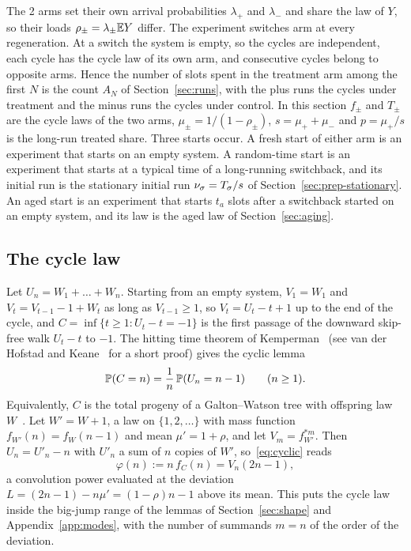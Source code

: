 The 2 arms set their own arrival probabilities $\lambda_\plus$ and $\lambda_\minus$ and
share the law of $Y$, so their loads $\rho_\pm=\lambda_\pm\mathbb{E} Y$ differ. The experiment
switches arm at every regeneration. At a switch the system is empty, so the cycles are
independent, each cycle has the cycle law of its own arm, and consecutive cycles belong to
opposite arms. Hence the number of slots spent in the treatment arm among the first $N$ is
the count $A_N$ of Section~\ref{sec:runs}, with the plus runs the cycles under treatment and
the minus runs the cycles under control. In this section $f_\pm$ and $T_\pm$ are the cycle
laws of the two arms, $\mu_\pm=1/(1-\rho_\pm)$, $s=\mu_\plus+\mu_\minus$ and $p=\mu_\plus/s$ is the
long-run treated share. Three starts occur. A fresh start of either arm is an experiment
that starts on an empty system. A random-time start is an experiment that starts at a
typical time of a long-running switchback, and its initial run is the stationary initial run
$\nu_\sigma=T_\sigma/s$ of Section~\ref{sec:prep-stationary}. An aged start is an experiment that
starts $t_a$ slots after a switchback started on an empty system, and its law is the aged law
of Section~\ref{sec:aging}.

\subsection{The cycle law}\label{sec:exposure-cycle}

Let $U_n=W_1+\dots+W_n$. Starting from an empty system, $V_1=W_1$ and $V_t=V_{t-1}-1+W_t$ as
long as $V_{t-1}\ge1$, so $V_t=U_t-t+1$ up to the end of the cycle, and
$C=\inf\{t\ge1:U_t-t=-1\}$ is the first passage of the downward skip-free walk $U_t-t$ to
$-1$. The hitting time theorem of Kemperman~\cite{kemperman1961} (see van der Hofstad and
Keane~\cite{vdhk2008} for a short proof) gives the cyclic lemma
\begin{equation}\label{eq:cyclic}
 \mathbb{P}(C=n)=\frac1n\,\mathbb{P}(U_n=n-1)\qquad(n\ge1).
\end{equation}
Equivalently, $C$ is the total progeny of a Galton--Watson tree with offspring law
$W$~\cite{dwass1969}. Let $W'=W+1$, a law on $\{1,2,\dots\}$ with mass function
$f_{W'}(n)=f_W(n-1)$ and mean $\mu'=1+\rho$, and let $V_m=f_{W'}^{*m}$. Then $U_n=U'_n-n$ with
$U'_n$ a sum of $n$ copies of $W'$, so~\eqref{eq:cyclic} reads
\begin{equation}\label{eq:phi}
 \varphi(n):=n\,f_C(n)=V_n(2n-1),
\end{equation}
a convolution power evaluated at the deviation $L=(2n-1)-n\mu'=(1-\rho)n-1$ above its mean.
This puts the cycle law inside the big-jump range of the lemmas of Section~\ref{sec:shape}
and Appendix~\ref{app:modes}, with the number of summands $m=n$ of the order of the deviation.

